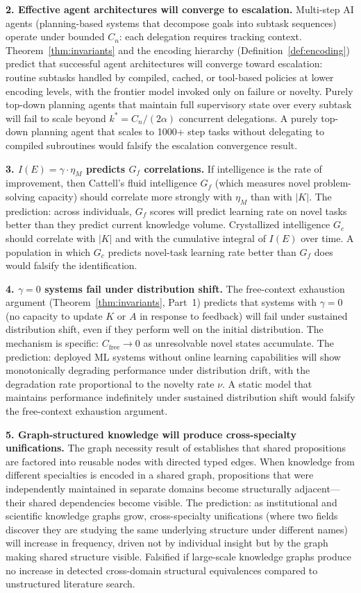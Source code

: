 \documentclass[11pt]{article}
\theoremstyle{definition}
\theoremstyle{remark}
\begin{document}
\textbf{2. Effective agent architectures will converge to escalation.}
Multi-step AI agents (planning-based systems that decompose goals into
subtask sequences) operate under bounded $C_n$: each delegation
requires tracking context. Theorem~\ref{thm:invariants} and the
encoding hierarchy (Definition~\ref{def:encoding}) predict that
successful agent architectures will converge toward escalation:
routine subtasks handled by compiled, cached, or tool-based policies
at lower encoding levels, with the frontier model invoked only on
failure or novelty. Purely top-down planning agents that maintain
full supervisory state over every subtask will fail to scale beyond
$k^* = C_n / (2\alpha)$ concurrent delegations. A purely top-down
planning agent that scales to 1000+ step tasks without delegating to
compiled subroutines would falsify the escalation convergence result.

\textbf{3. $I(E) = \gamma \cdot \eta_M$ predicts $G_f$ correlations.}
If intelligence is the rate of improvement, then Cattell's fluid
intelligence $G_f$ (which measures novel problem-solving capacity)
should correlate more strongly with $\eta_M$ than with $|K|$. The
prediction: across individuals, $G_f$ scores will predict learning
rate on novel tasks better than they predict current knowledge
volume. Crystallized intelligence $G_c$ should correlate with
$|K|$ and with the cumulative integral of $I(E)$ over time. A
population in which $G_c$ predicts novel-task learning rate better
than $G_f$ does would falsify the identification.

\textbf{4. $\gamma = 0$ systems fail under distribution shift.}
The free-context exhaustion argument
(Theorem~\ref{thm:invariants}, Part~1) predicts that systems with
$\gamma = 0$ (no capacity to update $K$ or $A$ in response to
feedback) will fail under sustained distribution shift, even if they
perform well on the initial distribution. The mechanism is specific:
$C_{\mathrm{free}} \to 0$ as unresolvable novel states accumulate.
The prediction: deployed ML systems without online learning
capabilities will show monotonically degrading performance under
distribution drift, with the degradation rate proportional to the
novelty rate $\nu$. A static model that maintains performance
indefinitely under sustained distribution shift would falsify the
free-context exhaustion argument.

\textbf{5. Graph-structured knowledge will produce cross-specialty
unifications.}
The graph necessity result of \cite{McCarthy2026a}
establishes that shared propositions are factored into reusable nodes
with directed typed edges. When knowledge from different specialties
is encoded in a shared graph, propositions that were independently
maintained in separate domains become structurally adjacent---their
shared dependencies become visible. The prediction: as institutional
and scientific knowledge graphs grow, cross-specialty unifications
(where two fields discover they are studying the same underlying
structure under different names) will increase in frequency, driven
not by individual insight but by the graph making shared structure
visible. Falsified if large-scale knowledge graphs produce no
increase in detected cross-domain structural equivalences compared
to unstructured literature search.
\end{document}
